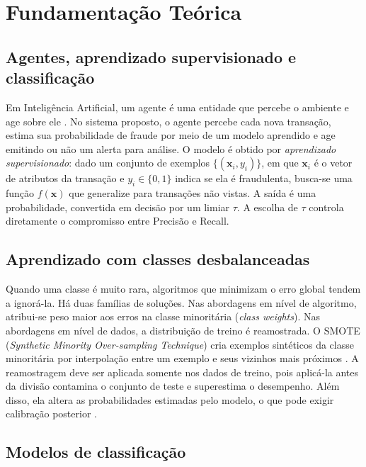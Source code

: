 \documentclass[12pt]{article}
\begin{document}
\section{Fundamentação Teórica}

\subsection{Agentes, aprendizado supervisionado e classificação}

Em Inteligência Artificial, um agente é uma entidade que percebe o ambiente e
age sobre ele \cite{russell:2021}. No sistema proposto, o agente percebe cada
nova transação, estima sua probabilidade de fraude por meio de um modelo
aprendido e age emitindo ou não um alerta para análise. O modelo é obtido por
\emph{aprendizado supervisionado}: dado um conjunto de exemplos
$\{(\mathbf{x}_i, y_i)\}$, em que $\mathbf{x}_i$ é o vetor de atributos da
transação e $y_i \in \{0, 1\}$ indica se ela é fraudulenta, busca-se uma função
$f(\mathbf{x})$ que generalize para transações não vistas. A saída é uma
probabilidade, convertida em decisão por um limiar $\tau$. A escolha de $\tau$
controla diretamente o compromisso entre Precisão e Recall.

\subsection{Aprendizado com classes desbalanceadas}

Quando uma classe é muito rara, algoritmos que minimizam o erro global tendem a
ignorá-la. Há duas famílias de soluções. Nas abordagens em nível de algoritmo,
atribui-se peso maior aos erros na classe minoritária (\emph{class weights}).
Nas abordagens em nível de dados, a distribuição de treino é reamostrada. O
SMOTE (\emph{Synthetic Minority Over-sampling Technique}) cria exemplos
sintéticos da classe minoritária por interpolação entre um exemplo e seus
vizinhos mais próximos \cite{chawla:2002}. A reamostragem deve ser aplicada
somente nos dados de treino, pois aplicá-la antes da divisão contamina o
conjunto de teste e superestima o desempenho. Além disso, ela altera as
probabilidades estimadas pelo modelo, o que pode exigir calibração posterior
\cite{dalpozzolo:2015}.

\subsection{Modelos de classificação}
\end{document}
